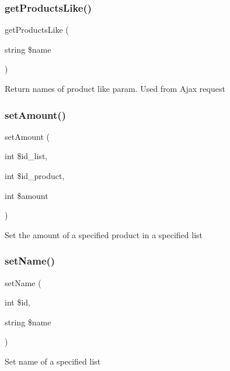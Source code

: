 \subsubsection{\texorpdfstring{get\+Products\+Like()}{getProductsLike()}}
{\footnotesize\ttfamily get\+Products\+Like (\begin{DoxyParamCaption}\item[{string}]{\$name }\end{DoxyParamCaption})}

Return names of product like param. Used from Ajax request \mbox{\label{class_shopping_list__model_a8271bb7a9235c363295b640d4ba58a84}} 
\subsubsection{\texorpdfstring{set\+Amount()}{setAmount()}}
{\footnotesize\ttfamily set\+Amount (\begin{DoxyParamCaption}\item[{int}]{\$id\+\_\+list,  }\item[{int}]{\$id\+\_\+product,  }\item[{int}]{\$amount }\end{DoxyParamCaption})}

Set the amount of a specified product in a specified list \mbox{\label{class_shopping_list__model_a51e2298ec742c4ef89fc2be60437a3dc}} 
\subsubsection{\texorpdfstring{set\+Name()}{setName()}}
{\footnotesize\ttfamily set\+Name (\begin{DoxyParamCaption}\item[{int}]{\$id,  }\item[{string}]{\$name }\end{DoxyParamCaption})}

Set name of a specified list \mbox{\label{class_shopping_list__model_a4c9b3d77ee0eb69acead909068091079}} 
